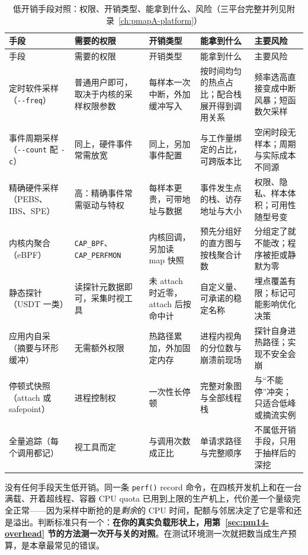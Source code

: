 \documentclass[12pt,a4paper,fontset=fandol]{ctexbook}
\newcommand{\Fn}[1]{\texttt{#1()}}
\newcommand{\Tp}[1]{\texttt{#1}}
\newcommand{\Opt}[1]{\texttt{-\/-#1}}
\newcommand{\Bk}{\discretionary{}{}{}}
\begin{document}
\begin{longtable}{>{\raggedright\arraybackslash}p{}>{\raggedright\arraybackslash}p{}>{\raggedright\arraybackslash}p{}>{\raggedright\arraybackslash}p{}>{\raggedright\arraybackslash}p{}}
\caption{低开销手段对照：权限、开销类型、能拿到什么、风险（三平台完整并列见附录~\ref{ch:pmapA-platform}）}\label{tab:pm14-method}\\
\toprule
手段 & 需要的权限 & 开销类型 & 能拿到什么 & 主要风险 \\
\midrule
\endfirsthead
\toprule
手段 & 需要的权限 & 开销类型 & 能拿到什么 & 主要风险 \\
\midrule
\endhead
\bottomrule
\endfoot
\bottomrule
\endlastfoot
定时软件采样（\Opt{freq}） & 普通用户即可，取决于内核的采样权限参数 & 每样本一次中断，外加缓冲写入 & 按时间均匀的热点占比；配合栈展开得到调用关系 & 频率选高直接变成中断风暴；短函数欠采样 \\
事件周期采样（\Opt{count} 配 \Tp{-c}） & 同上，硬件事件常需放宽 & 同上，另加事件配置 & 与工作量绑定的占比，可跨版本比 & 空闲时段无样本；周期与实际成本不同源 \\
精确硬件采样（PEBS、IBS、SPE） & 高：精确事件常需驱动与特权 & 每样本更贵，可带地址与数据 & 事件发生点的栈、访存地址与大小 & 权限、隐私、样本体积；可用性随型号变 \\
内核内聚合（eBPF） & \Tp{CAP{\Bk}\_BPF}、\Tp{CAP{\Bk}\_PERFMON} & 内核回调，另加读 map 快照 & 预先分组好的直方图与按栈聚合计数 & 分组定了就不能改；程序被拒或静默为零 \\
静态探针（USDT 一类） & 读探针元数据即可，采集时视工具 & 未 attach 时近零，attach 后按命中计 & 自定义量、可承诺的稳定名称 & 埋点覆盖有限；标记可能影响优化决策 \\
应用内自采（摘要与环形缓冲） & 无需额外权限 & 热路径累加，外加固定内存 & 进程内视角的分位数与崩溃前现场 & 探针自身进热路径；实现不安全会崩 \\
停顿式快照（attach 或 safepoint） & 进程控制权 & 一次性长停顿 & 完整对象图与全部线程栈 & 与``不能停''冲突；只适合低峰或摘流实例 \\
全量追踪（每个调用都记） & 视工具而定 & 与调用次数成正比 & 单请求路径与完整顺序 & 不属低开销手段，只用于抽样后的深挖 \\
\end{longtable}

\begin{warning}[title={把低开销当成手段的固有属性}]
\label{box:pm14-warn-lowcost}
没有任何手段天生低开销。同一条 \Fn{perf} record 命令，在四核开发机上和在一台满载、开着超线程、容器 CPU quota 已用到上限的生产机上，代价差一个量级完全正常——因为采样中断抢的是\emph{剩余}的 CPU 时间，配额与邻居决定了它是零和还是溢出。判断标准只有一个：\textbf{在你的真实负载形状上，用第~\ref{sec:pm14-overhead} 节的方法测一次开与关的对照}。在测试环境测一次就把数当成生产预算，是本章最常见的错误。
\end{warning}
\end{document}
